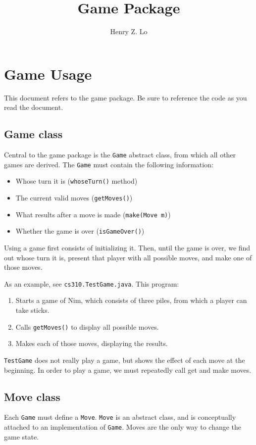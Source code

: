 \documentclass{article}
\begin{document}
\title{Game Package}
\author{Henry Z. Lo}
\maketitle

\section{Game Usage}
This document refers to the game package.  Be sure to reference the code as you read the document.

\subsection{Game class}
Central to the game package is the \texttt{Game} abstract class, from which all other games are derived.  The \texttt{Game} must contain the following information:
\begin{itemize}
\item Whose turn it is (\texttt{whoseTurn()} method)
\item The current valid moves (\texttt{getMoves()})
\item What results after a move is made (\texttt{make(Move m)})
\item Whether the game is over (\texttt{isGameOver()})
\end{itemize}
Using a game first consists of initializing it.  Then, until the game is over, we find out whose turn it is, present that player with all possible moves, and make one of those moves.

As an example, see \texttt{cs310.TestGame.java}.  This program:
\begin{enumerate}
\item Starts a game of Nim, which consists of three piles, from which a player can take sticks.
\item Calls \texttt{getMoves()} to display all possible moves.
\item Makes each of those moves, displaying the results.
\end{enumerate}
\texttt{TestGame} does not really play a game, but shows the effect of each move at the beginning.  In order to play a game, we must repeatedly call get and make moves.

\subsection{Move class}
Each \texttt{Game} must define a \texttt{Move}.  \texttt{Move} is an abstract class, and is conceptually attached to an implementation of \texttt{Game}.  Moves are the only way to change the game state.
\end{document}
